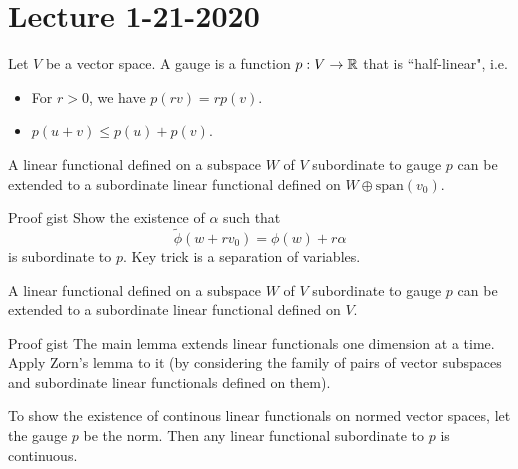 \section{Lecture 1-21-2020}
\begin{dfn}
    Let $V$ be a vector space. A gauge is a function $p: V \rightarrow {\mathbb R}$ that is ``half-linear", i.e.
    \begin{itemize}
    \item
    For $r > 0$, we have $p(rv) = rp(v)$.
    \item
    $p(u + v) \leq p(u) + p(v)$.
    \end{itemize}
\end{dfn}

\begin{thm}
A linear functional defined on a subspace $W$ of $V$ subordinate to gauge $p$ can be extended to a subordinate linear functional defined on $W \oplus \text{span}(v_0)$.
\end{thm}

\begin{details}{Proof gist}
    Show the existence of $\alpha$ such that
    \[
    \tilde{\phi}(w + rv_0) = \phi(w) + r \alpha
    \]
    is subordinate to $p$. Key trick is a separation of variables.
\end{details}

\begin{thm}
    A linear functional defined on a subspace $W$ of $V$ subordinate to gauge $p$ can be extended to a subordinate linear functional defined on $V$.
\end{thm}

\begin{details}{Proof gist}
    The main lemma extends linear functionals one dimension at a time. Apply Zorn's lemma to it (by considering the family of pairs of vector subspaces and subordinate linear functionals defined on them).
\end{details}

\begin{remark}
    To show the existence of continous linear functionals on normed vector spaces, let the gauge $p$ be the norm. Then any linear functional subordinate to $p$ is continuous.
\end{remark}
